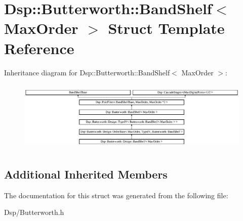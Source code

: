 \hypertarget{structDsp_1_1Butterworth_1_1BandShelf}{\section{Dsp\-:\-:Butterworth\-:\-:Band\-Shelf$<$ Max\-Order $>$ Struct Template Reference}
\label{structDsp_1_1Butterworth_1_1BandShelf}
}
Inheritance diagram for Dsp\-:\-:Butterworth\-:\-:Band\-Shelf$<$ Max\-Order $>$\-:\begin{figure}[H]
\begin{center}
\leavevmode
\includegraphics[height=3.407708cm]{structDsp_1_1Butterworth_1_1BandShelf}
\end{center}
\end{figure}
\subsection*{Additional Inherited Members}


The documentation for this struct was generated from the following file\-:\begin{DoxyCompactItemize}
\item 
Dsp/Butterworth.\-h\end{DoxyCompactItemize}
